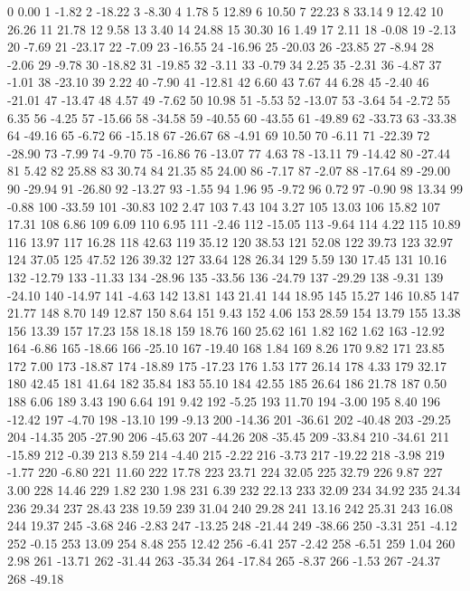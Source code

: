 0 0.00
1 -1.82
2 -18.22
3 -8.30
4 1.78
5 12.89
6 10.50
7 22.23
8 33.14
9 12.42
10 26.26
11 21.78
12 9.58
13 3.40
14 24.88
15 30.30
16 1.49
17 2.11
18 -0.08
19 -2.13
20 -7.69
21 -23.17
22 -7.09
23 -16.55
24 -16.96
25 -20.03
26 -23.85
27 -8.94
28 -2.06
29 -9.78
30 -18.82
31 -19.85
32 -3.11
33 -0.79
34 2.25
35 -2.31
36 -4.87
37 -1.01
38 -23.10
39 2.22
40 -7.90
41 -12.81
42 6.60
43 7.67
44 6.28
45 -2.40
46 -21.01
47 -13.47
48 4.57
49 -7.62
50 10.98
51 -5.53
52 -13.07
53 -3.64
54 -2.72
55 6.35
56 -4.25
57 -15.66
58 -34.58
59 -40.55
60 -43.55
61 -49.89
62 -33.73
63 -33.38
64 -49.16
65 -6.72
66 -15.18
67 -26.67
68 -4.91
69 10.50
70 -6.11
71 -22.39
72 -28.90
73 -7.99
74 -9.70
75 -16.86
76 -13.07
77 4.63
78 -13.11
79 -14.42
80 -27.44
81 5.42
82 25.88
83 30.74
84 21.35
85 24.00
86 -7.17
87 -2.07
88 -17.64
89 -29.00
90 -29.94
91 -26.80
92 -13.27
93 -1.55
94 1.96
95 -9.72
96 0.72
97 -0.90
98 13.34
99 -0.88
100 -33.59
101 -30.83
102 2.47
103 7.43
104 3.27
105 13.03
106 15.82
107 17.31
108 6.86
109 6.09
110 6.95
111 -2.46
112 -15.05
113 -9.64
114 4.22
115 10.89
116 13.97
117 16.28
118 42.63
119 35.12
120 38.53
121 52.08
122 39.73
123 32.97
124 37.05
125 47.52
126 39.32
127 33.64
128 26.34
129 5.59
130 17.45
131 10.16
132 -12.79
133 -11.33
134 -28.96
135 -33.56
136 -24.79
137 -29.29
138 -9.31
139 -24.10
140 -14.97
141 -4.63
142 13.81
143 21.41
144 18.95
145 15.27
146 10.85
147 21.77
148 8.70
149 12.87
150 8.64
151 9.43
152 4.06
153 28.59
154 13.79
155 13.38
156 13.39
157 17.23
158 18.18
159 18.76
160 25.62
161 1.82
162 1.62
163 -12.92
164 -6.86
165 -18.66
166 -25.10
167 -19.40
168 1.84
169 8.26
170 9.82
171 23.85
172 7.00
173 -18.87
174 -18.89
175 -17.23
176 1.53
177 26.14
178 4.33
179 32.17
180 42.45
181 41.64
182 35.84
183 55.10
184 42.55
185 26.64
186 21.78
187 0.50
188 6.06
189 3.43
190 6.64
191 9.42
192 -5.25
193 11.70
194 -3.00
195 8.40
196 -12.42
197 -4.70
198 -13.10
199 -9.13
200 -14.36
201 -36.61
202 -40.48
203 -29.25
204 -14.35
205 -27.90
206 -45.63
207 -44.26
208 -35.45
209 -33.84
210 -34.61
211 -15.89
212 -0.39
213 8.59
214 -4.40
215 -2.22
216 -3.73
217 -19.22
218 -3.98
219 -1.77
220 -6.80
221 11.60
222 17.78
223 23.71
224 32.05
225 32.79
226 9.87
227 3.00
228 14.46
229 1.82
230 1.98
231 6.39
232 22.13
233 32.09
234 34.92
235 24.34
236 29.34
237 28.43
238 19.59
239 31.04
240 29.28
241 13.16
242 25.31
243 16.08
244 19.37
245 -3.68
246 -2.83
247 -13.25
248 -21.44
249 -38.66
250 -3.31
251 -4.12
252 -0.15
253 13.09
254 8.48
255 12.42
256 -6.41
257 -2.42
258 -6.51
259 1.04
260 2.98
261 -13.71
262 -31.44
263 -35.34
264 -17.84
265 -8.37
266 -1.53
267 -24.37
268 -49.18
